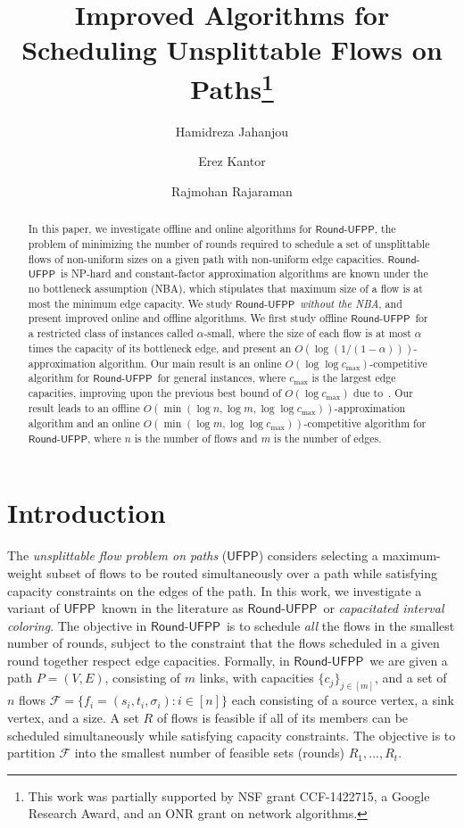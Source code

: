 \documentclass[a4paper,UKenglish]{lipics-v2016}
\title{Improved Algorithms for Scheduling Unsplittable Flows on Paths\footnote{This work was partially supported by NSF grant CCF-1422715, a Google Research Award, and an ONR grant on network algorithms.}}
\author[1]{Hamidreza Jahanjou}
\author[2]{Erez Kantor}
\author[3]{Rajmohan Rajaraman}
\affil[1]{Northeastern University, Boston, MA, USA\\
  \texttt{hamid@ccs.neu.edu}}
\affil[2]{University of Massachusetts, Amherst, MA, USA\\
  \texttt{erez.kantor@gmail.com}}
\affil[3]{Northeastern University, Boston, MA, USA\\
  \texttt{rraj@ccs.neu.edu}}
\newcommand{\ufpp}{\mbox{$\mathsf{UFPP}$}}
\newcommand{\rufpp}{\mbox{$\mathsf{Round}$-$\mathsf{UFPP}$}}
\theoremstyle{plain}
\begin{document}
\maketitle

\begin{abstract}
In this paper, we investigate offline and online algorithms for \rufpp, the problem of minimizing the number of rounds required to schedule a set of unsplittable flows of non-uniform sizes on a given path with non-uniform edge capacities.   \rufpp\ is NP-hard and constant-factor approximation algorithms are known under the no bottleneck assumption (NBA), which stipulates that maximum size of a flow is at most the minimum edge capacity.  We study \rufpp\ {\em without the NBA}, and present improved online and offline algorithms.  We first study offline \rufpp\ for a restricted class of instances called $\alpha$-small, where the size of each flow is at most $\alpha$ times the capacity of its bottleneck edge, and present an $O(\log(1/(1-\alpha)))$-approximation algorithm.  Our main result is an online $O(\log\log c_{\max})$-competitive algorithm for \rufpp\ for general instances, where $c_{\max}$ is the largest edge capacities, improving upon the previous best bound of $O(\log c_{\max})$ due to~\cite{epstein}.  Our result leads to an offline $O(\min(\log n, \log m, \log\log c_{\max}))$-approximation algorithm and an online $O(\min(\log m, \log\log c_{\max}))$-competitive algorithm for \rufpp, where $n$ is the number of flows and $m$ is the number of edges.
 \end{abstract}

\section{Introduction}
The {\em unsplittable flow problem on paths} (\ufpp) considers selecting a maximum-weight subset of flows to be routed simultaneously over a path while satisfying capacity constraints on the edges of the path.    
In this work, we investigate a variant of \ufpp\ known in the literature as \rufpp\ or {\em capacitated interval coloring}. The objective in \rufpp\ is to schedule {\em all}\/ the flows in the smallest number of rounds, subject to the constraint that the flows scheduled in a given round together respect edge capacities. Formally, in \rufpp\, we are given a path $P=(V,E)$, consisting of $m$ links, with capacities $\{c_j\}_{j\in [m]}$, and a set of $n$ flows $\mathcal{F}= \{f_i=(s_i, t_i, \sigma_i): i\in [n]\}$ each consisting of a source vertex, a sink vertex, and a size. A set $R$ of flows is feasible if all of its members can be scheduled simultaneously while satisfying capacity constraints. The objective is to partition $\mathcal{F}$ into the smallest number of feasible sets (rounds) $R_1, ..., R_t$. 
\end{document}
